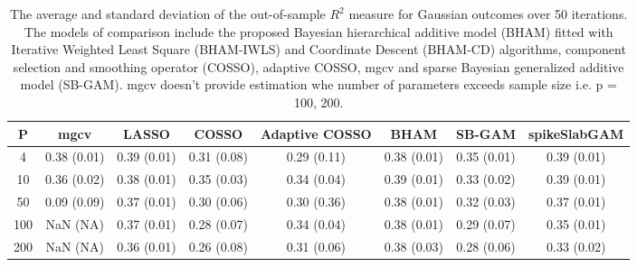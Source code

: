 \begin{table}[ht]
\centering
\begin{tabular}{cccccccc}
  \hline
P & mgcv & LASSO & COSSO & Adaptive COSSO & BHAM & SB-GAM & spikeSlabGAM \\ 
  \hline
  4 & 0.38 (0.01) & 0.39 (0.01) & 0.31 (0.08) & 0.29 (0.11) & 0.38 (0.01) & 0.35 (0.01) & 0.39 (0.01) \\ 
   10 & 0.36 (0.02) & 0.38 (0.01) & 0.35 (0.03) & 0.34 (0.04) & 0.39 (0.01) & 0.33 (0.02) & 0.39 (0.01) \\ 
   50 & 0.09 (0.09) & 0.37 (0.01) & 0.30 (0.06) & 0.30 (0.36) & 0.38 (0.01) & 0.32 (0.03) & 0.37 (0.01) \\ 
  100 & NaN (NA) & 0.37 (0.01) & 0.28 (0.07) & 0.34 (0.04) & 0.38 (0.01) & 0.29 (0.07) & 0.35 (0.01) \\ 
  200 & NaN (NA) & 0.36 (0.01) & 0.26 (0.08) & 0.31 (0.06) & 0.38 (0.03) & 0.28 (0.06) & 0.33 (0.02) \\ 
   \hline
\end{tabular}
\caption{The average and standard deviation of the out-of-sample $R^2$ measure for
    Gaussian outcomes over 50 iterations. The models of comparison include the proposed Bayesian
    hierarchical additive model (BHAM) fitted with Iterative Weighted Least Square (BHAM-IWLS) and
    Coordinate Descent (BHAM-CD) algorithms, component selection and smoothing operator (COSSO), adaptive
    COSSO, mgcv and sparse Bayesian generalized additive model (SB-GAM). mgcv doesn't provide estimation
    whe number of parameters exceeds sample size i.e. p = 100, 200.} 
\label{tab:lnr_gaus}
\end{table}
